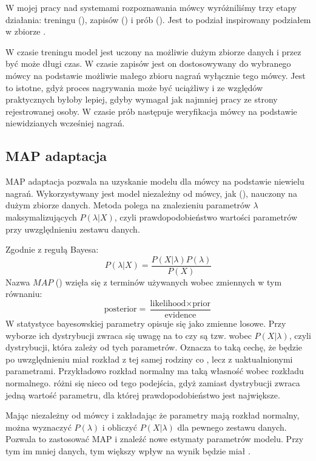 W mojej pracy nad systemami rozpoznawania mówcy wyróżniliśmy trzy etapy działania: treningu (),
zapisów () i prób (). Jest to podział inspirowany podziałem w zbiorze .

W czasie treningu model jest uczony na możliwie dużym zbiorze danych i przez być może długi czas. W czasie zapisów
jest on dostosowywany do wybranego mówcy na podstawie możliwie małego zbioru nagrań wyłącznie tego mówcy. Jest
to istotne, gdyż proces nagrywania może być uciążliwy i ze względów praktycznych byłoby lepiej, gdyby wymagał
jak najmniej pracy ze strony rejestrowanej osoby. W czasie prób następuje weryfikacja mówcy na podstawie niewidzianych
wcześniej nagrań.

\subsection{MAP adaptacja}

MAP adaptacja pozwala na uzyskanie modelu dla mówcy na podstawie niewielu nagrań. Wykorzystywany jest model niezależny
od mówcy, jak  (), nauczony na dużym zbiorze danych.
Metoda polega na znalezieniu parametrów $\lambda$
maksymalizujących $P(\lambda | X)$, czyli prawdopodobieństwo wartości parametrów przy uwzględnieniu zestawu danych.

Zgodnie z regułą Bayesa:
$$P(\lambda | X) = \frac{P(X | \lambda) P(\lambda)}{P(X)}$$
Nazwa $MAP$ () wzięła się z terminów używanych wobec zmiennych w tym równaniu:
$$\text{posterior} = \frac{\text{likelihood} \times \text{prior}}{\text{evidence}}$$
W statystyce bayesowskiej parametry opisuje się jako zmienne losowe. Przy wyborze ich dystrybucji zwraca się uwagę
na to czy są tzw.  wobec $P(X | \lambda)$, czyli dystrybucji, która zależy od tych parametrów.
Oznacza to taką cechę, że  będzie po uwzględnieniu  miał rozkład z tej samej
rodziny co , lecz z uaktualnionymi parametrami. Przykładowo rozkład normalny ma taką własność wobec
rozkładu normalnego.   różni się nieco od tego podejścia, gdyż zamiast dystrybucji zwraca jedną
wartość parametru, dla której prawdopodobieństwo jest największe.

Mając  niezależny od mówcy i zakładając że parametry mają rozkład normalny, można wyznaczyć
$P(\lambda)$ i obliczyć $P(X | \lambda)$ dla pewnego zestawu danych. Pozwala to zastosować MAP i znaleźć nowe
estymaty parametrów modelu. Przy tym im mniej danych, tym większy wpływ na wynik będzie miał .

